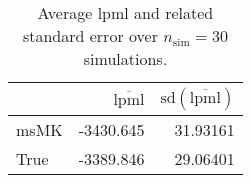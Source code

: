 \begin{table}[H]

\caption{Average lpml and related standard error over $n_{\text{sim}} = 30$ simulations.}
\centering
\begin{tabular}[t]{lrr}
\toprule
  & $\overbar{\text{lpml}}$ & $\text{sd}(\overbar{\text{lpml}})$\\
\midrule
msMK & -3430.645 & 31.93161\\
True & -3389.846 & 29.06401\\
\bottomrule
\end{tabular}
\end{table}